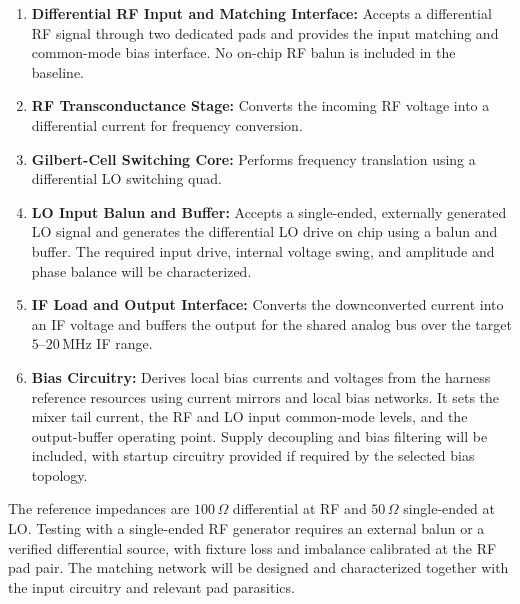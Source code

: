 \begin{enumerate}
    \item \textbf{Differential RF Input and Matching Interface:}
    Accepts a differential RF signal through two dedicated pads and provides the input matching and common-mode bias interface.
    No on-chip RF balun is included in the baseline.

    \item \textbf{RF Transconductance Stage:}
    Converts the incoming RF voltage into a differential current for frequency conversion.

    \item \textbf{Gilbert-Cell Switching Core:}
    Performs frequency translation using a differential LO switching quad.

    \item \textbf{LO Input Balun and Buffer:}
    Accepts a single-ended, externally generated LO signal and generates the differential LO drive on chip using a balun and buffer.
    The required input drive, internal voltage swing, and amplitude and phase balance will be characterized.


    \item \textbf{IF Load and Output Interface:}
    Converts the downconverted current into an IF voltage and buffers the output for the shared analog bus over the target \(5\)--\(20\,\mathrm{MHz}\) IF range.

    \item \textbf{Bias Circuitry:}
    Derives local bias currents and voltages from the harness reference resources using current mirrors and local bias networks.
    It sets the mixer tail current, the RF and LO input common-mode levels, and the output-buffer operating point.
    Supply decoupling and bias filtering will be included, with startup circuitry provided if required by the selected bias topology.
\end{enumerate}

The reference impedances are \(100\,\Omega\) differential at RF and \(50\,\Omega\) single-ended at LO.
Testing with a single-ended RF generator requires an external balun or a verified differential source, with fixture loss and imbalance calibrated at the RF pad pair.
The matching network will be designed and characterized together with the input circuitry and relevant pad parasitics.
